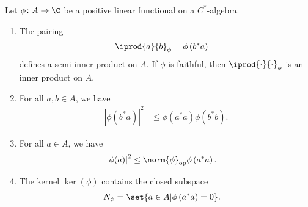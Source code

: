 \documentclass[10pt]{mypackage}
\DeclareMathOperator{\op}{op}
\begin{document}
\begin{proposition}
  Let $\phi\colon A\rightarrow \C$ be a positive linear functional on a $C^{\ast}$-algebra.
  \begin{enumerate}[(1)]
    \item The pairing
      \begin{align*}
        \iprod{a}{b}_{\phi} &= \phi\left(b^{\ast}a\right)
      \end{align*}
      defines a semi-inner product on $A$. If $\phi$ is faithful, then $ \iprod{\cdot}{\cdot}_{\phi} $ is an inner product on $A$.
    \item For all $a,b\in A$, we have
      \begin{align*}
        \left\vert \phi\left(b^{\ast}a\right) \right\vert^2 &\leq \phi\left(a^{\ast}a\right)\phi\left(b^{\ast}b\right).
      \end{align*}
    \item For all $a\in A$, we have
      \begin{align*}
        \left\vert \phi(a) \right\vert^2 &\leq \norm{\phi}_{\op}\phi\left(a^{\ast}a\right).
      \end{align*}
    \item The kernel $\ker\left(\phi\right)$ contains the closed subspace
      \begin{align*}
        N_{\phi} &= \set{a\in A | \phi\left(a^{\ast}a\right) = 0}.
      \end{align*}
  \end{enumerate}
\end{proposition}
\end{document}
